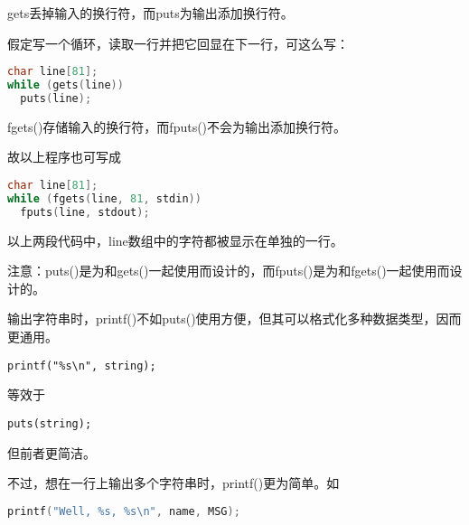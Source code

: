 \begin{frame}[fragile]
gets丢掉输入的换行符，而puts为输出添加换行符。\vspace{0.1in}

假定写一个循环，读取一行并把它回显在下一行，可这么写：
\begin{lstlisting}[language=c]
char line[81];
while (gets(line))
  puts(line);
\end{lstlisting} 
\end{frame}

\begin{frame}[fragile]
{\tf fgets()}存储输入的换行符，而{\tf fputs()}不会为输出添加换行符。\vspace{0.1in}

故以上程序也可写成
\begin{lstlisting}[language=c]
char line[81];
while (fgets(line, 81, stdin))
  fputs(line, stdout);
\end{lstlisting} \vspace{0.1in}

以上两段代码中，{\tf line}数组中的字符都被显示在单独的一行。
\end{frame}

\begin{frame}[fragile]
注意：{\tf puts()}是为和{\tf gets()}一起使用而设计的，而{\tf fputs()}是为和{\tf fgets()}一起使用而设计的。
\end{frame}

\begin{frame}[fragile] 
输出字符串时，{\tf printf()}不如{\tf puts()}使用方便，但其可以格式化多种数据类型，因而更通用。

\begin{lstlisting}[basicstyle=\ttfamily]
printf("%s\n", string);
\end{lstlisting}
等效于
\begin{lstlisting}[basicstyle=\ttfamily]
puts(string);
\end{lstlisting}
但前者更简洁。
\end{frame}

\begin{frame}[fragile] 
不过，想在一行上输出多个字符串时，{\tf printf()}更为简单。如
\begin{lstlisting}[language=c]
printf("Well, %s, %s\n", name, MSG);
\end{lstlisting}
\end{frame}

